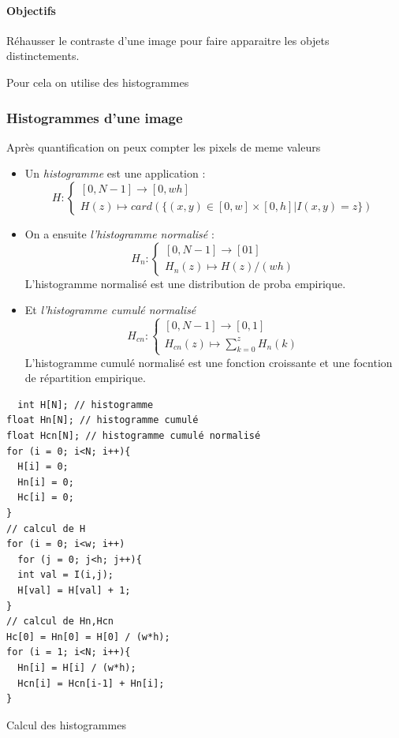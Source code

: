 \documentclass[main.tex]{subfiles}
\begin{document}
\paragraph{Objectifs} Réhausser le contraste d'une image pour faire apparaitre les objets distinctements.

Pour cela on utilise des histogrammes

\subsubsection{Histogrammes d'une image}

Après quantification on peux compter les pixels de meme valeurs
\begin{defin}
  \begin{itemize}
  \item Un \emph{histogramme} est une application :
  \[
    H:
    \begin{cases}
      [0,N-1] \to [0,wh]\\
      H(z) \mapsto card(\{(x,y)\in[0,w]\times [0,h] | I(x,y) = z \})
    \end{cases}
  \]
\item On a ensuite \emph{l'histogramme normalisé} :
\[
    H_n:
    \begin{cases}
      [0,N-1] \to [01]\\
      H_n(z) \mapsto H(z)/(wh)
    \end{cases}
  \]
  L'histogramme normalisé est une distribution de proba empirique.
\item Et \emph{l'histogramme cumulé normalisé}
  \[
 H_{cn}:
    \begin{cases}
      [0,N-1] \to [0,1]\\
      H_{cn}(z) \mapsto\sum_{k=0}^{z} H_n(k)
    \end{cases}
  \]
  L'histogramme cumulé normalisé est une fonction croissante et une focntion de répartition empirique.
\end{itemize}
\end{defin}


\begin{listing}[H]
\begin{verbatim}
  int H[N]; // histogramme
float Hn[N]; // histogramme cumulé
float Hcn[N]; // histogramme cumulé normalisé
for (i = 0; i<N; i++){
  H[i] = 0;
  Hn[i] = 0;
  Hc[i] = 0;
}
// calcul de H
for (i = 0; i<w; i++)
  for (j = 0; j<h; j++){
  int val = I(i,j);
  H[val] = H[val] + 1;
}
// calcul de Hn,Hcn
Hc[0] = Hn[0] = H[0] / (w*h);
for (i = 1; i<N; i++){
  Hn[i] = H[i] / (w*h);
  Hcn[i] = Hcn[i-1] + Hn[i];
}
\end{verbatim}
\caption{Calcul des histogrammes}
\end{listing}
\end{document}
